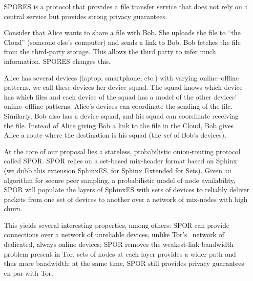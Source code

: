 

\acs{SPORES} is a protocol that provides a file transfer service that does not
rely on a central service but provides strong privacy guarantees.

Consider that Alice wants to share a file with Bob. She uploads the file
to \enquote{the Cloud} (someone else's computer) and sends a link to Bob. Bob
fetches the file from the third-party storage. This allows the third
party to infer much information. \Ac{SPORES} changes this.

Alice has several devices (laptop, smartphone, etc.) with varying
online--offline patterns, we call these devices her device squad. The
squad knows which device has which files and each device of the squad
has a model of the other devices' online--offline patterns. Alice's
devices can coordinate the sending of the file. Similarly, Bob also has
a device squad, and his squad can coordinate receiving the file. Instead
of Alice giving Bob a link to the file in the Cloud, Bob gives Alice a
route where the destination is his squad (the \emph{set} of Bob's devices).

At the core of our proposal lies a stateless, probabilistic
onion-routing protocol called \ac{SPOR}. \Ac{SPOR} relies on a set-based
mix-header format based on Sphinx~\cite{Sphinx} (we dubb this extension
SphinxES, for Sphinx Extended for Sets). Given an algorithm for secure
peer sampling, a probabilistic model of node availability, \ac{SPOR} will
populate the layers of SphinxES with sets of devices to reliably deliver
packets from one set of devices to another over a network of mix-nodes
with high churn.

This yields several interesting properties, among others: \ac{SPOR} can
provide connections over a network of unreliable devices, unlike 
Tor's~\cite{Tor} network of dedicated, always online devices; \ac{SPOR} removes 
the weakest-link bandwidth problem present in Tor, sets of nodes at each
layer provides a wider path and thus more bandwidth; at the same time,
\ac{SPOR} still provides privacy guarantees en par with Tor.
